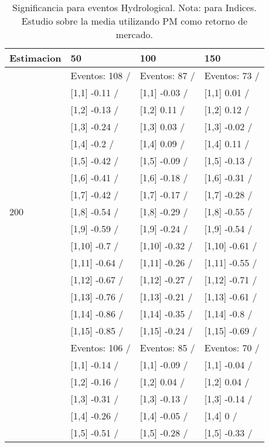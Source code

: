 \begin{table}

\caption{Significancia para eventos Hydrological. Nota: para Indices. Estudio sobre la media utilizando PM como retorno de mercado.}
\centering
\begin{tabular}[t]{llll}
\toprule
Estimacion & 50 & 100 & 150\\
\midrule
 & Eventos:  108 / & Eventos:  87 / & Eventos:  73 /\\
 & {}[1,1] -0.11  / & {}[1,1] -0.03  / & {}[1,1] 0.01  /\\
 & {}[1,2] -0.13  / & {}[1,2] 0.11  / & {}[1,2] 0.12  /\\
 & {}[1,3] -0.24  / & {}[1,3] 0.03  / & {}[1,3] -0.02  /\\
 & {}[1,4] -0.2  / & {}[1,4] 0.09  / & {}[1,4] 0.11  /\\
\addlinespace
 & {}[1,5] -0.42  / & {}[1,5] -0.09  / & {}[1,5] -0.13  /\\
 & {}[1,6] -0.41  / & {}[1,6] -0.18  / & {}[1,6] -0.31  /\\
 & {}[1,7] -0.42  / & {}[1,7] -0.17  / & {}[1,7] -0.28  /\\
200 & {}[1,8] -0.54  / & {}[1,8] -0.29  / & {}[1,8] -0.55  /\\
 & {}[1,9] -0.59  / & {}[1,9] -0.24  / & {}[1,9] -0.54  /\\
\addlinespace
 & {}[1,10] -0.7  / & {}[1,10] -0.32  / & {}[1,10] -0.61  /\\
 & {}[1,11] -0.64  / & {}[1,11] -0.26  / & {}[1,11] -0.55  /\\
 & {}[1,12] -0.67  / & {}[1,12] -0.27  / & {}[1,12] -0.71  /\\
 & {}[1,13] -0.76  / & {}[1,13] -0.21  / & {}[1,13] -0.61  /\\
 & {}[1,14] -0.86  / & {}[1,14] -0.35  / & {}[1,14] -0.8  /\\
\addlinespace
 & {}[1,15] -0.85  / & {}[1,15] -0.24  / & {}[1,15] -0.69  /\\
 & Eventos:  106 / & Eventos:  85 / & Eventos:  70 /\\
 & {}[1,1] -0.14  / & {}[1,1] -0.09  / & {}[1,1] -0.04  /\\
 & {}[1,2] -0.16  / & {}[1,2] 0.04  / & {}[1,2] 0.04  /\\
 & {}[1,3] -0.31  / & {}[1,3] -0.13  / & {}[1,3] -0.14  /\\
\addlinespace
 & {}[1,4] -0.26  / & {}[1,4] -0.05  / & {}[1,4] 0  /\\
 & {}[1,5] -0.51  / & {}[1,5] -0.28  / & {}[1,5] -0.33  /\\

\end{tabular}
\end{table}
